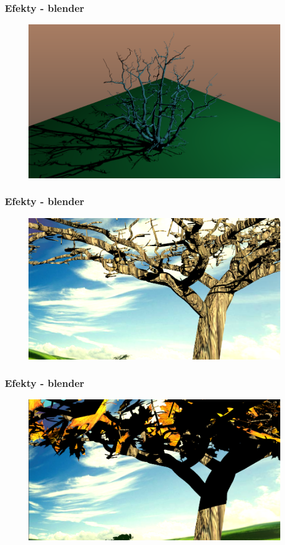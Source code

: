 \documentclass[blue,table]{beamer}
\begin{document}
\begin{frame}\frametitle{Efekty - blender}
\begin{figure}
\includegraphics[scale=0.4]{img/blender/blender9.png} 
\end{figure}
\end{frame}

\begin{frame}\frametitle{Efekty - blender}
\begin{figure}
\includegraphics[scale=0.3]{img/blender/blender10.png} 
\end{figure}
\end{frame}

\begin{frame}\frametitle{Efekty - blender}
\begin{figure}
\includegraphics[scale=0.3]{img/blender/blender11.png} 
\end{figure}
\end{frame}
\end{document}
